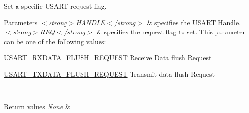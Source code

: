 Set a specific U\+S\+A\+RT request flag. 


\begin{DoxyParams}{Parameters}
{\em $<$strong$>$\+H\+A\+N\+D\+L\+E$<$/strong$>$} & specifies the U\+S\+A\+RT Handle. \\
\hline
{\em $<$strong$>$\+R\+E\+Q$<$/strong$>$} & specifies the request flag to set. This parameter can be one of the following values\+: \begin{DoxyItemize}
\item \hyperlink{group___u_s_a_r_t___request___parameters_ga3d08169bc6516ef929b161f47ecba555}{U\+S\+A\+R\+T\+\_\+\+R\+X\+D\+A\+T\+A\+\_\+\+F\+L\+U\+S\+H\+\_\+\+R\+E\+Q\+U\+E\+ST} Receive Data flush Request \item \hyperlink{group___u_s_a_r_t___request___parameters_ga5d3de7b3c6b8f2691dc6ddae10c2355d}{U\+S\+A\+R\+T\+\_\+\+T\+X\+D\+A\+T\+A\+\_\+\+F\+L\+U\+S\+H\+\_\+\+R\+E\+Q\+U\+E\+ST} Transmit data flush Request\end{DoxyItemize}
\\
\hline
\end{DoxyParams}

\begin{DoxyRetVals}{Return values}
{\em None} & \\
\hline
\end{DoxyRetVals}
